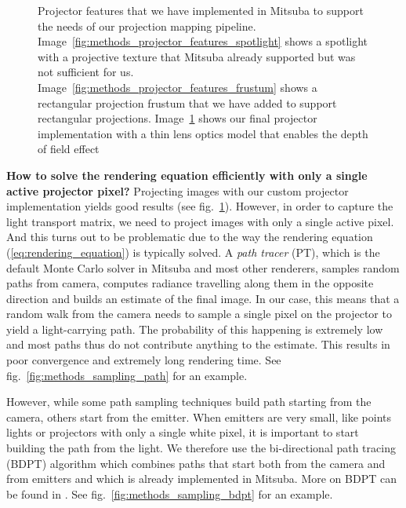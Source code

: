 \begin{figure}[]
\begin{subfigure}[b]{0.32\textwidth}
        \caption{}
        \label{fig:methods_projector_features_thin_lens}
    \end{subfigure}
    \caption{Projector features that we have implemented in Mitsuba to support the needs of our projection mapping pipeline. Image~\ref{fig:methods_projector_features_spotlight} shows  a spotlight with a projective texture that Mitsuba already supported but was not sufficient for us. Image~\ref{fig:methods_projector_features_frustum} shows a rectangular projection frustum that we have added to support rectangular projections. Image~\ref{fig:methods_projector_features_thin_lens} shows our final projector implementation with a thin lens optics model that enables the depth of field effect}
    \label{fig:methods_projector_features}
\end{figure}

\textbf{How to solve the rendering equation efficiently with only a single active projector pixel?} Projecting images with our custom projector implementation yields good results (see fig.~\ref{fig:methods_projector_features_thin_lens}). However, in order to capture the light transport matrix, we need to project images with only a single active pixel. And this turns out to be problematic due to the way the rendering equation (\ref{eq:rendering_equation}) is typically solved. A \textit{path tracer} (PT), which is the default Monte Carlo solver in Mitsuba and most other renderers, samples random paths from camera, computes radiance travelling along them in the opposite direction and builds an estimate of the final image. In our case, this means that a random walk from the camera needs to sample a single pixel on the projector to yield a light-carrying path. The probability of this happening is extremely low and most paths thus do not contribute anything to the estimate. This results in poor convergence and extremely long rendering time. See fig.~\ref{fig:methods_sampling_path} for an example.

However, while some path sampling techniques build path starting from the camera, others start from the emitter. When emitters are very small, like points lights or projectors with only a single white pixel, it is important to start building the path from the light. We therefore use the bi-directional path tracing (BDPT) algorithm which combines paths that start both from the camera and from emitters and which is already implemented in Mitsuba. More on BDPT can be found in \citet{Veach1997}. See fig.~\ref{fig:methods_sampling_bdpt} for an example.

